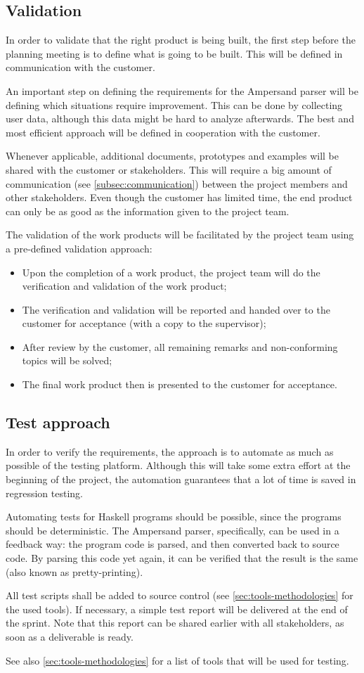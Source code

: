 \subsection{Validation}
In order to validate that the right product is being built, the first step before the planning meeting is to define what is going to be built.
This will be defined in communication with the customer.

An important step on defining the requirements for the Ampersand parser will be defining which situations require improvement.
This can be done by collecting user data, although this data might be hard to analyze afterwards.
The best and most efficient approach will be defined in cooperation with the customer.

Whenever applicable, additional documents, prototypes and examples will be shared with the customer or stakeholders.
This will require a big amount of communication (see \autoref{subsec:communication}) between the project members and other stakeholders.
Even though the customer has limited time, the end product can only be as good as the information given to the project team.

The validation of the work products will be facilitated by the project team using a pre-defined validation approach:
\begin{itemize}
	\item Upon the completion of a work product, the project team will do the verification and validation of the work product;
	\item The verification and validation will be reported and handed over to the customer for acceptance (with a copy to the supervisor);
	\item After review by the customer, all remaining remarks and non-conforming topics will be solved;
	\item The final work product then is presented to the customer for acceptance.
\end{itemize}

\subsection{Test approach}
In order to verify the requirements, the approach is to automate as much as possible of the testing platform.
Although this will take some extra effort at the beginning of the project, the automation guarantees that a lot of time is saved in regression testing.

Automating tests for Haskell programs should be possible, since the programs should be deterministic.
The Ampersand parser, specifically, can be used in a feedback way: the program code is parsed, and then converted back to source code.
By parsing this code yet again, it can be verified that the result is the same (also known as pretty-printing).

All test scripts shall be added to source control (see \autoref{sec:tools-methodologies} for the used tools).
If necessary, a simple test report will be delivered at the end of the sprint.
Note that this report can be shared earlier with all stakeholders, as soon as a deliverable is ready.

See also \autoref{sec:tools-methodologies} for a list of tools that will be used for testing.
